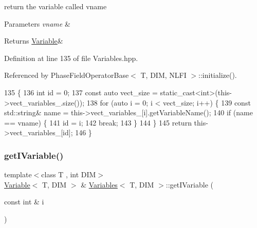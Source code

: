 return the variable called vname 


\begin{DoxyParams}{Parameters}
{\em vname} & \\
\hline
\end{DoxyParams}
\begin{DoxyReturn}{Returns}
\hyperlink{classVariable}{Variable}\& 
\end{DoxyReturn}


Definition at line 135 of file Variables.\+hpp.



Referenced by Phase\+Field\+Operator\+Base$<$ T, D\+I\+M, N\+L\+F\+I $>$\+::initialize().


\begin{DoxyCode}
135                                                                         \{
136   \textcolor{keywordtype}{int} \textcolor{keywordtype}{id} = 0;
137   \textcolor{keyword}{const} \textcolor{keyword}{auto} vect\_size = \textcolor{keyword}{static\_cast<}\textcolor{keywordtype}{int}\textcolor{keyword}{>}(this->vect\_variables\_.size());
138   \textcolor{keywordflow}{for} (\textcolor{keyword}{auto} i = 0; i < vect\_size; i++) \{
139     \textcolor{keyword}{const} std::string& name = this->vect\_variables\_[i].getVariableName();
140     \textcolor{keywordflow}{if} (name == vname) \{
141       \textcolor{keywordtype}{id} = i;
142       \textcolor{keywordflow}{break};
143     \}
144   \}
145   \textcolor{keywordflow}{return} this->vect\_variables\_[id];
146 \}
\end{DoxyCode}
\mbox{\label{classVariables_a0fb59f4145974f7d284a5b6f906285a9}} 
\subsubsection{\texorpdfstring{get\+I\+Variable()}{getIVariable()}}
{\footnotesize\ttfamily template$<$class T , int D\+IM$>$ \\
\hyperlink{classVariable}{Variable}$<$ T, D\+IM $>$ \& \hyperlink{classVariables}{Variables}$<$ T, D\+IM $>$\+::get\+I\+Variable (\begin{DoxyParamCaption}\item[{const int \&}]{i }\end{DoxyParamCaption})}



